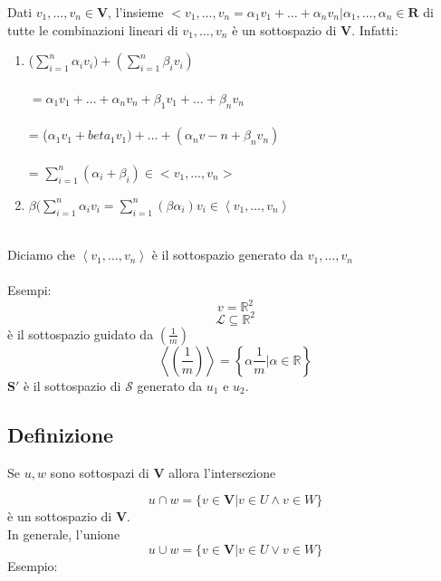 \documentclass[12pt]{article}
\begin{document}
Dati $v_1, \dots, v_n \in \mathbf{V}$, l'insieme $<v_1, \dots, v_n = { \alpha_1 v_1 + \dots + \alpha_nv_n | \alpha_1, \dots, \alpha_n \in \mathbf{R}}$ di tutte le combinazioni lineari di $v_1, \dots, v_n$ è un sottospazio di $\mathbf{V}$. Infatti:

\begin{enumerate}
    \item ($\sum^n_{i = 1} \alpha_iv_i) + (\sum^n_{i = 1} \beta_iv_i)$\\\\
    $= \alpha_1v_1 + \dots + \alpha_nv_n + \beta_1v_1 + \dots + \beta_nv_n$\\\\
    = ($\alpha_1v_1 + beta_1v_1) + \dots + (\alpha_nv-n + \beta_nv_n)$\\\\
    = $\sum^n_{i = 1} (\alpha_i + \beta_i) \in <v_1, \dots ,v_n>$\\
    \item $\beta(\sum^n_{i = 1} \alpha_iv_i = \sum^n_{i=1} (\beta \alpha_i)v_i \in \left<v_1, \dots, v_n\right>$\\\\
\end{enumerate}
Diciamo che $\left< v_1, \dots, v_n\right>$ è il sottospazio generato da $v_1, \dots, v_n$
\\\\Esempi:
\[v = \mathbb{R}^2\]
\[\mathcal{L} \subseteq \mathbb{R}^2\]
è il sottospazio guidato da $\left(\frac{1}{m}\right)$
\[\left<\left(\frac{1}{m}\right)\right> = \left\{\alpha \frac{1}{m} | \alpha \in \mathbb{R}\right\}\]
$\mathbf{S}'$ è il sottospazio di $\mathcal{S}$ generato da $u_1$ e $u_2.$

\subsection{Definizione}

Se $u, w$ sono sottospazi di $\mathbf{V}$ allora l'intersezione

\[u \cap w = \{v \in \mathbf{V} | v \in U \land v \in W\}\]
è un sottospazio di $\mathbf{V}$.\\
In generale, l'unione
\[u \cup w = \{v \in \mathbf{V} | v \in U \lor v \in W\}\]
Esempio:
\end{document}
